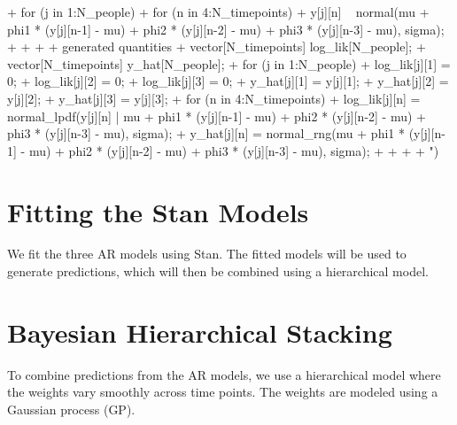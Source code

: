 \documentclass{article}
\begin{document}
\begin{Schunk}
\begin{Sinput}
{+   for (j in 1:N_people) {
+     for (n in 4:N_timepoints) {
+       y[j][n] ~ normal(mu + phi1 * (y[j][n-1] - mu) + phi2 * (y[j][n-2] - mu) + phi3 * (y[j][n-3] - mu), sigma);
+     }
+   }
+ }
+ generated quantities {
+   vector[N_timepoints] log_lik[N_people];
+   vector[N_timepoints] y_hat[N_people];
+   for (j in 1:N_people) {
+     log_lik[j][1] = 0;
+     log_lik[j][2] = 0;
+     log_lik[j][3] = 0;
+     y_hat[j][1] = y[j][1];
+     y_hat[j][2] = y[j][2];
+     y_hat[j][3] = y[j][3];
+     for (n in 4:N_timepoints) {
+       log_lik[j][n] = normal_lpdf(y[j][n] | mu + phi1 * (y[j][n-1] - mu) + phi2 * (y[j][n-2] - mu) + phi3 * (y[j][n-3] - mu), sigma);
+       y_hat[j][n] = normal_rng(mu + phi1 * (y[j][n-1] - mu) + phi2 * (y[j][n-2] - mu) + phi3 * (y[j][n-3] - mu), sigma);
+     }
+   }
+ }
+ ")
\end{Sinput}
\end{Schunk}

\section{Fitting the Stan Models}

We fit the three AR models using Stan. The fitted models will be used to generate predictions, which will then be combined using a hierarchical model.

\begin{Schunk}
\end{Schunk}

\section{Bayesian Hierarchical Stacking}

To combine predictions from the AR models, we use a hierarchical model where the weights vary smoothly across time points. The weights are modeled using a Gaussian process (GP).
\end{document}

